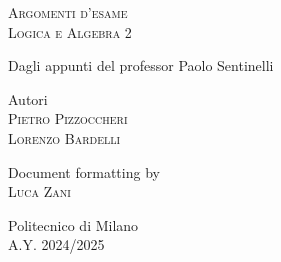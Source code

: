 \documentclass[10pt,a4paper,twoside]{book}
\begin{document}
\frontmatter

\pagestyle{empty}

\hypertarget{mytitlepage}{}

\vspace*{\fill}
\begin{center}

    {\Huge
        \textsc{Argomenti d'esame}}\\
    \vspace*{0.3cm}
    {\Huge
        \textsc{Logica e Algebra 2 }}\\

    \vspace*{1cm}


    {\large Dagli appunti del professor Paolo Sentinelli}\\

    \vspace*{1cm}

    Autori\\
    \vspace*{0.1cm}
    \textsc{Pietro Pizzoccheri}\\
    \textsc{Lorenzo Bardelli}\\

    \vspace*{0.4cm}

    Document formatting by\\
    \vspace*{0.1cm}
    \textsc{Luca Zani}\\

    \vspace*{1cm}

    Politecnico di Milano\\A.Y. 2024/2025
\end{center}
\vspace*{\fill}
\clearpage

\hypertarget{mycopyright}{}

\clearpage


% 

\cleardoublepage
\pagestyle{toc}
\hypertarget{mytoc}{}
\bookmark[dest=mytoc,level=chapter]{\contentsname}
\tableofcontents
\cleardoublepage

\pagestyle{fancy}
\mainmatter
\end{document}
